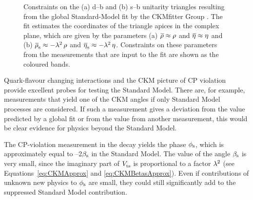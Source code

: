 \begin{figure}[p]
\begin{subfigure}{0.65\textwidth}
    \caption{}
  \end{subfigure}
  \caption{Constraints on the (a) d--b and (b) s--b unitarity triangles resulting from the global Standard-Model fit by the CKMfitter Group
           \cite{Charles:2004jd}. The fit estimates the coordinates of the triangle apices in the complex plane, which are given by the
	   parameters (a) $\rhobar\approx\rho$ and $\etabar\approx\eta$ and (b) $\rhosbar\approx-\lam^2\,\rho$ and
           $\etasbar\approx-\lam^2\,\eta$.
           Constraints on these parameters from the measurements that are input to the fit are shown as the coloured bands.}
  \label{fig:unitTriangleMeas}
\end{figure}

Quark-flavour changing interactions and the CKM picture of CP violation provide excellent probes for testing the Standard Model. There are,
for example, measurements that yield one of the CKM angles if only Standard Model processes are considered. If such a measurement gives a
deviation from the value predicted by a global fit or from the value from another measurement, this would be clear evidence for physics
beyond the Standard Model.

The CP-violation measurement in the \BstoJpsiphi{} decay yields the phase $\phi_\text{s}$, which is approximately equal to --2$\beta_\text{s}$ in the Standard
Model. The value of the angle $\beta_\text{s}$ is very small, since the imaginary part of $\Vts$ is proportional to a factor $\lambda^2$ (see
Equations~\ref{eq:CKMApprox} and \ref{eq:CKMBetasApprox}). Even if contributions of unknown new physics to $\phi_\text{s}$ are small, they could
still significantly add to the suppressed Standard Model contribution.
